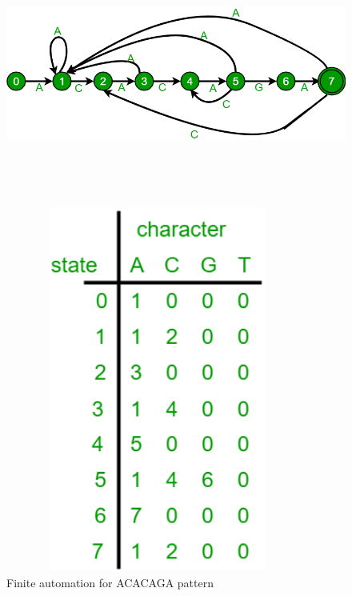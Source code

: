 \documentclass[11pt,a4paper]{article}
\begin{document}
\begin{figure}[H]
    \centering
    \includegraphics[width=16cm, height=8cm]{finiteauto1.png}
    \label{fig:StoringExample}
\end{figure}

\begin{figure}[H]
    \centering
    \includegraphics[width=10cm, height=12cm]{finiteauto2.png}
    \caption{Finite automation for ACACAGA pattern}
    \label{fig:StoringExample}
\end{figure}
\end{document}

